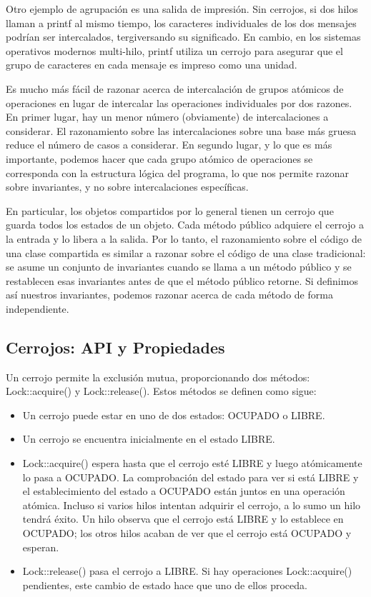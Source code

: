 \documentclass[10pt]{book}
\begin{document}
Otro ejemplo de agrupación es una salida de impresión. Sin cerrojos, si dos hilos llaman a {\mf printf} al mismo tiempo, los caracteres individuales de los dos mensajes podrían ser intercalados, tergiversando su significado. En cambio, en los sistemas operativos modernos multi-hilo, {\mf printf} utiliza un cerrojo para asegurar que el grupo de caracteres en cada mensaje es impreso como una unidad.

Es mucho más fácil de razonar acerca de intercalación de grupos atómicos de operaciones en lugar de intercalar las operaciones individuales por dos razones. En primer lugar, hay un menor número (obviamente) de intercalaciones a considerar. El razonamiento sobre las intercalaciones sobre una base más gruesa reduce el número de casos a considerar. En segundo lugar, y lo que es más importante, podemos hacer que cada grupo atómico de operaciones se corresponda con la estructura lógica del programa, lo que nos permite razonar sobre invariantes, y no sobre intercalaciones específicas.

En particular, los objetos compartidos por lo general tienen un cerrojo que guarda todos los estados de un objeto. Cada método público adquiere el cerrojo a la entrada y lo libera a la salida. Por lo tanto, el razonamiento sobre el código de una clase compartida es similar a razonar sobre el código de una clase tradicional: se asume un conjunto de invariantes cuando se llama a un método público y se restablecen esas invariantes antes de que el método público retorne. Si definimos así nuestros invariantes, podemos razonar acerca de cada método de forma independiente.

\subsection{Cerrojos: API y Propiedades}
Un cerrojo permite la exclusión mutua, proporcionando dos métodos: {\mf Lock::acquire()} y {\mf Lock::release()}. Estos métodos se definen como sigue:
\begin{itemize}
\item Un cerrojo puede estar en uno de dos estados: OCUPADO o LIBRE.
\item Un cerrojo se encuentra inicialmente en el estado LIBRE.
\item {\mf Lock::acquire()} espera hasta que el cerrojo esté LIBRE y luego atómicamente lo pasa a OCUPADO. La comprobación del estado para ver si está LIBRE y el establecimiento del estado a OCUPADO están juntos en una operación atómica. Incluso si varios hilos intentan adquirir el cerrojo, a lo sumo un hilo tendrá éxito. Un hilo observa que el cerrojo está LIBRE y lo establece en OCUPADO; los otros hilos acaban de ver que el cerrojo está OCUPADO y esperan.
\item {\mf Lock::release()} pasa el cerrojo a LIBRE. Si hay operaciones {\mf Lock::acquire()} pendientes, este cambio de estado hace que uno de ellos proceda.
\end{itemize}
\end{document}
